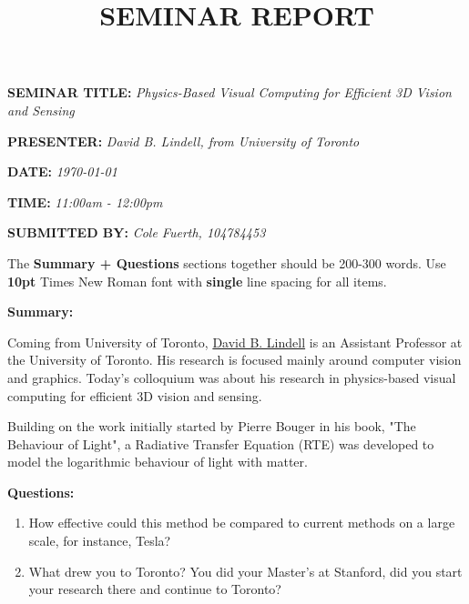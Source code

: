 \documentclass[12pt]{article}
\title{\sffamily\fontsize{16}{18}\selectfont \textbf{SEMINAR REPORT}}
\author{}
\date{}
\begin{document}
\maketitle

{\selectfont\raggedright
    \textbf{SEMINAR TITLE:} \textit{Physics-Based Visual Computing for Efficient 3D Vision and Sensing} \par
    \textbf{PRESENTER:} \textit{David B. Lindell, from University of Toronto} \par
    \textbf{DATE:} \textit{\today} \par
    \textbf{TIME:} \textit{11:00am - 12:00pm} \par
    \textbf{SUBMITTED BY: } \textit{Cole Fuerth, 104784453} \par
}

\selectfont
\fontsize{10}{12}\selectfont
\raggedright
The \textbf{Summary + Questions} sections together should be 200-300 words. Use \textbf{10pt} Times New Roman font with \textbf{single} line spacing for all items.

\selectfont
\fontsize{12}{14}\selectfont
\textbf{Summary:} \par

\selectfont
\fontsize{10}{12}\selectfont
\raggedright


Coming from University of Toronto, \href{https://davidlindell.com/}{David B. Lindell} is an Assistant Professor at the University of Toronto. His research is focused mainly around computer vision and graphics. Today's colloquium was about his research in physics-based visual computing for efficient 3D vision and sensing. \par

Building on the work initially started by Pierre Bouger in his book, "The Behaviour of Light", a Radiative Transfer Equation (RTE) was developed to model the logarithmic behaviour of light with matter.

\selectfont
\fontsize{12}{14}\selectfont
\textbf{Questions:} \par
\selectfont
\fontsize{10}{12}\selectfont
\raggedright
\begin{enumerate}
    \item How effective could this method be compared to current methods on a large scale, for instance, Tesla?
    \item What drew you to Toronto? You did your Master's at Stanford, did you start your research there and continue to Toronto?
\end{enumerate}
\end{document}
